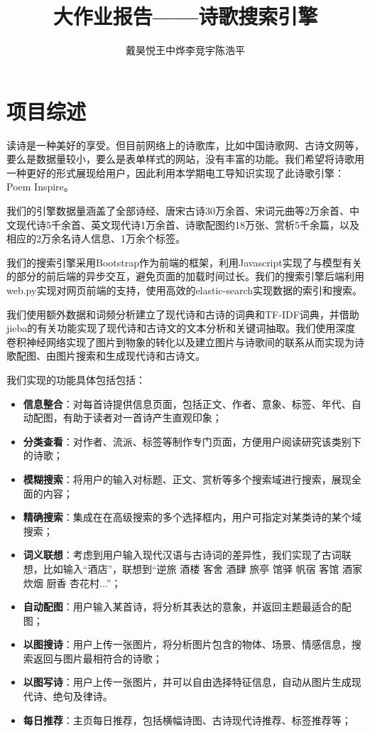 \documentclass[a4paper, 10pt]{article}
\title{大作业报告——诗歌搜索引擎}
\author{戴昊悦\quad 王中烨\quad 李竞宇\quad 陈浩平}
\begin{document}
\maketitle
\tableofcontents
\newpage

\section{项目综述}
读诗是一种美好的享受。但目前网络上的诗歌库，比如中国诗歌网、古诗文网等，要么是数据量较小，要么是表单样式的网站，没有丰富的功能。我们希望将诗歌用一种更好的形式展现给用户，因此利用本学期电工导知识实现了此诗歌引擎：Poem Inspire。

我们的引擎数据量涵盖了全部诗经、唐宋古诗30万余首、宋词元曲等2万余首、中文现代诗5千余首、英文现代诗1万余首、诗歌配图约18万张、赏析5千余篇，以及相应的2万余名诗人信息、1万余个标签。

我们的搜索引擎采用Bootstrap作为前端的框架，利用Javascript实现了与模型有关的部分的前后端的异步交互，避免页面的加载时间过长。我们的搜索引擎后端利用web.py实现对网页前端的支持，使用高效的elastic-search实现数据的索引和搜索。

我们使用额外数据和词频分析建立了现代诗和古诗的词典和TF-IDF词典，并借助jieba的有关功能实现了现代诗和古诗文的文本分析和关键词抽取。我们使用深度卷积神经网络实现了图片到物象的转化以及建立图片与诗歌间的联系从而实现为诗歌配图、由图片搜索和生成现代诗和古诗文。

我们实现的功能具体包括包括：
\begin{itemize}
\setlength{\itemsep}{0pt}
\setlength{\parsep}{0pt}
\setlength{\parskip}{0pt}
    \item \textbf{信息整合}：对每首诗提供信息页面，包括正文、作者、意象、标签、年代、自动配图，有助于读者对一首诗产生直观印象；
    \item \textbf{分类查看}：对作者、流派、标签等制作专门页面，方便用户阅读研究该类别下的诗歌；
    \item \textbf{模糊搜索}：将用户的输入对标题、正文、赏析等多个搜索域进行搜索，展现全面的内容；
    \item \textbf{精确搜索}：集成在在高级搜索的多个选择框内，用户可指定对某类诗的某个域搜索；
    \item \textbf{词义联想}：考虑到用户输入现代汉语与古诗词的差异性，我们实现了古词联想，比如输入“酒店”，联想到“逆旅 酒楼 客舍 酒肆 旅亭 馆驿 帆宿 客馆 酒家 炊烟 厨香 杏花村...”；
    \item \textbf{自动配图}：用户输入某首诗，将分析其表达的意象，并返回主题最适合的配图；
    \item \textbf{以图搜诗}：用户上传一张图片，将分析图片包含的物体、场景、情感信息，搜索返回与图片最相符合的诗歌；
    \item \textbf{以图写诗}：用户上传一张图片，并可以自由选择特征信息，自动从图片生成现代诗、绝句及律诗。
    \item \textbf{每日推荐}：主页每日推荐，包括横幅诗图、古诗现代诗推荐、标签推荐等；
\end{itemize}
\end{document}
